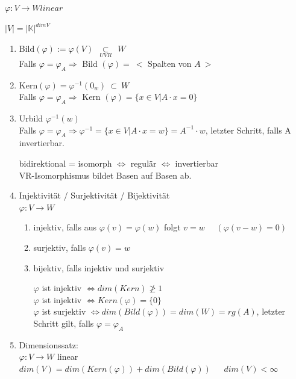 \documentclass{scrartcl}
\begin{document}
$\varphi : V \rightarrow W linear$
\begin{Notiz}
$|V| = |\mathbb{K}|^{dimV}$
\end{Notiz}
\begin{enumerate}
\item Bild$(\varphi) := \varphi(V) ~~ \underset{UVR}{\subset} ~~ W$\\
Falls $\varphi = \varphi_A \Rightarrow $ Bild $(\varphi) = ~<$ Spalten von $A~>$
\item Kern$(\varphi) = \varphi^{-1} (0_w) ~ \subset ~ W$\\
Falls $\varphi = \varphi_A \Rightarrow $ Kern $(\varphi) = \{x \in V | A \cdot x = 0 \}$
\item Urbild $\varphi^{-1} (w)$\\
Falls $\varphi = \varphi_A \Rightarrow \varphi^{-1} = \{x \in V | A \cdot x = w \} = A^{-1} \cdot w$, letzter Schritt, falls A invertierbar.
\begin{Notiz}
bidirektional = isomorph $\Leftrightarrow$ regulär $\Leftrightarrow$ invertierbar\\
VR-Isomorphismus bildet Basen auf Basen ab.
\end{Notiz}
\item Injektivität / Surjektivität / Bijektivität\\
$\varphi : V \rightarrow W$
    \begin{enumerate}
    \item injektiv, falls aus $\varphi (v) = \varphi (w) $ folgt $ v = w ~~~~~~ (\varphi (v - w) = 0)$
    \item surjektiv, falls $\varphi (v) = w$
    \item bijektiv, falls injektiv und surjektiv\\
    \begin{Notiz}
    $\varphi $ ist injektiv $\Leftrightarrow dim (Kern) \ngeq 1$ \\ 
    $\varphi $ ist injektiv $\Leftrightarrow Kern(\varphi) = \{0\}$ \\
    $\varphi $ ist surjektiv $\Leftrightarrow dim (Bild(\varphi)) = dim(W) = rg(A)$, letzter Schritt gilt, falls $\varphi = \varphi_A$ 
    \end{Notiz}
    \end{enumerate}
    \item Dimensionssatz: \\
    $\varphi : V \rightarrow W$ linear\\
    $dim(V) = dim(Kern (\varphi)) + dim(Bild(\varphi)) ~~~~~~~ dim(V) < \infty$
\end{enumerate}
\end{document}
